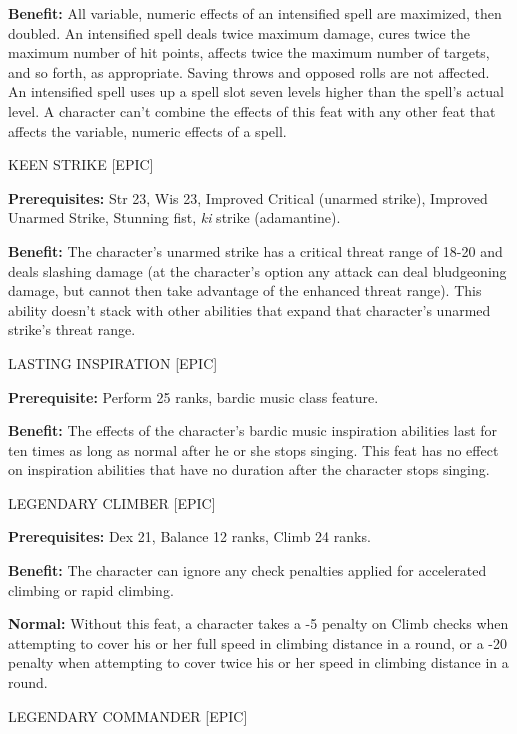 \documentclass{article}
\begin{document}
\textbf{Benefit:} All variable, numeric effects of an intensified spell are maximized, 
then doubled. An intensified spell deals twice maximum damage, cures twice the 
maximum number of hit points, affects twice the maximum number of targets, and 
so forth, as appropriate. Saving throws and opposed rolls are not affected. An 
intensified spell uses up a spell slot seven levels higher than the spell's actual 
level. A character can't combine the effects of this feat with any other feat that 
affects the variable, numeric effects of a spell. 

\vspace{12pt}
KEEN STRIKE [EPIC] 

\textbf{Prerequisites:} Str 23, Wis 23, Improved Critical (unarmed strike), Improved 
Unarmed Strike, Stunning fist, \textit{ki }strike (adamantine). 

\textbf{Benefit:} The character's unarmed strike has a critical threat range of 
18-20 and deals slashing damage (at the character's option any attack can deal 
bludgeoning damage, but cannot then take advantage of the enhanced threat range). 
This ability doesn't stack with other abilities that expand that character's unarmed 
strike's threat range. 

\vspace{12pt}
LASTING INSPIRATION [EPIC] 

\textbf{Prerequisite:} Perform 25 ranks, bardic music class feature. 

\textbf{Benefit:} The effects of the character's bardic music inspiration abilities 
last for ten times as long as normal after he or she stops singing. This feat has 
no effect on inspiration abilities that have no duration after the character stops 
singing. 

\vspace{12pt}
LEGENDARY CLIMBER [EPIC]

\textbf{Prerequisites:} Dex 21, Balance 12 ranks, Climb 24 ranks. 

\textbf{Benefit:} The character can ignore any check penalties applied for accelerated 
climbing or rapid climbing. 

\textbf{Normal:} Without this feat, a character takes a -5 penalty on Climb checks 
when attempting to cover his or her full speed in climbing distance in a round, 
or a -20 penalty when attempting to cover twice his or her speed in climbing distance 
in a round.

\vspace{12pt}
LEGENDARY COMMANDER [EPIC]
\end{document}
